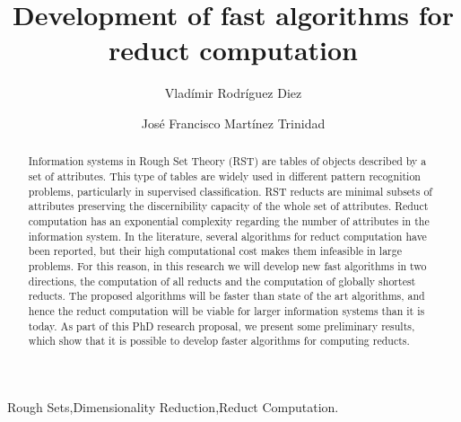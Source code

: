 \documentclass[authoryear,11pt]{elsarticle}
\begin{document}
	
	
	\title{Development of fast algorithms for reduct computation}
	
	\author{Vlad\'imir Rodr\'iguez Diez}
	\author{Jos\'e Francisco Mart\'inez Trinidad}
	
	\address{Computer Science Department\\National Institute of
	Astrophysics, Optics and Electronics\\
	Luis Enrique Erro \# 1, Santa Mar\'{\i}a Tonantzintla, Puebla,
	72840, M\'{e}xico} 
	
	
	
	\begin{abstract}
		Information systems in Rough Set Theory (RST) are tables of objects described by a set of attributes. 
		This type of tables are widely used in different pattern recognition problems, particularly in 
		supervised classification. RST reducts are minimal subsets of attributes preserving 
		the discernibility capacity of the whole set of attributes. Reduct computation has an exponential
		complexity regarding the number of attributes in the information system. In the literature, several
		algorithms for reduct computation have been reported, but their high computational cost makes 
		them infeasible in large problems. For this reason, in this research we will develop new fast
		algorithms in two directions, the computation of all reducts and the computation of globally 
		shortest reducts. The proposed algorithms will be faster than state of the art algorithms, and hence 
		the reduct computation will be viable for larger information systems than it is today. As part of this 
		PhD research proposal, we present some preliminary results, which show that it is possible to develop
		faster algorithms for computing reducts.
	\end{abstract}
	
	\begin{keyword}
		Rough Sets\sep Dimensionality Reduction\sep Reduct Computation.
	\end{keyword}

	\maketitle

\pagebreak 
\tableofcontents
\pagebreak 

\end{document}
